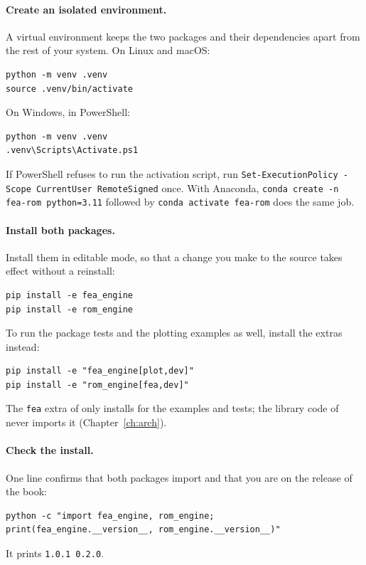 \paragraph{Create an isolated environment.} A virtual environment keeps the two packages and their dependencies apart from the rest of your system. On Linux and macOS:
\begin{lstlisting}[language={},numbers=none,keywordstyle={},commentstyle={},frame=single]
python -m venv .venv
source .venv/bin/activate
\end{lstlisting}
On Windows, in PowerShell:
\begin{lstlisting}[language={},numbers=none,keywordstyle={},commentstyle={},frame=single]
python -m venv .venv
.venv\Scripts\Activate.ps1
\end{lstlisting}
If PowerShell refuses to run the activation script, run \texttt{Set-ExecutionPolicy -Scope CurrentUser RemoteSigned} once. With Anaconda, \texttt{conda create -n fea-rom python=3.11} followed by \texttt{conda activate fea-rom} does the same job.

\paragraph{Install both packages.} Install them in editable mode, so that a change you make to the source takes effect without a reinstall:
\begin{lstlisting}[language={},numbers=none,keywordstyle={},commentstyle={},frame=single]
pip install -e fea_engine
pip install -e rom_engine
\end{lstlisting}
To run the package tests and the plotting examples as well, install the extras instead:
\begin{lstlisting}[language={},numbers=none,keywordstyle={},commentstyle={},frame=single]
pip install -e "fea_engine[plot,dev]"
pip install -e "rom_engine[fea,dev]"
\end{lstlisting}
The \texttt{fea} extra of \rom{} only installs \fea{} for the examples and tests; the library code of \rom{} never imports it (Chapter~\ref{ch:arch}).

\paragraph{Check the install.} One line confirms that both packages import and that you are on the release of the book:
\begin{lstlisting}[language={},numbers=none,keywordstyle={},commentstyle={},frame=single]
python -c "import fea_engine, rom_engine; print(fea_engine.__version__, rom_engine.__version__)"
\end{lstlisting}
It prints \texttt{1.0.1 0.2.0}.

